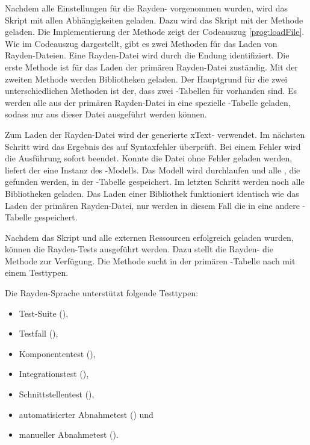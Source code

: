 \SuperPar
Nachdem alle Einstellungen für die Rayden- vorgenommen wurden, wird das Skript mit allen Abhängigkeiten geladen. Dazu wird das Skript mit der Methode  geladen. Die Implementierung der Methode zeigt der Codeauszug \ref{prog:loadFile}. Wie im Codeauszug dargestellt, gibt es zwei Methoden für das Laden von Rayden-Dateien. Eine Rayden-Datei wird durch die Endung  identifiziert. Die erste Methode  ist für das Laden der primären Rayden-Datei zuständig. Mit der zweiten Methode  werden Bibliotheken geladen. Der Hauptgrund für die zwei unterschiedlichen Methoden ist der, dass zwei -Tabellen für  vorhanden sind. Es werden alle  aus der primären Rayden-Datei in eine spezielle -Tabelle geladen, sodass nur  aus dieser Datei ausgeführt werden können.

\SuperPar
Zum Laden der Rayden-Datei wird der generierte xText- verwendet. Im nächsten Schritt wird das Ergebnis des  auf Syntaxfehler überprüft. Bei einem Fehler wird die Ausführung sofort beendet. Konnte die Datei ohne Fehler geladen werden, liefert der  eine Instanz des -Modells. Das Modell wird durchlaufen und alle , die gefunden werden, in der -Tabelle gespeichert. Im letzten Schritt werden noch alle Bibliotheken geladen. Das Laden einer Bibliothek funktioniert identisch wie das Laden der primären Rayden-Datei, nur werden in diesem Fall die  in eine andere -Tabelle gespeichert. 

\SuperPar
Nachdem das Skript und alle externen Ressourcen erfolgreich geladen wurden, können die Rayden-Tests ausgeführt werden. Dazu stellt die Rayden- die Methode  zur Verfügung. Die Methode sucht in der primären -Tabelle nach  mit einem Testtypen. 

\SuperPar
Die Rayden-Sprache unterstützt folgende Testtypen:

\begin{itemize}
\item Test-Suite (),
\item Testfall (),
\item Komponententest (),
\item Integrationstest (),
\item Schnittstellentest (),
\item automatisierter Abnahmetest () und
\item manueller Abnahmetest ().
\end{itemize}

